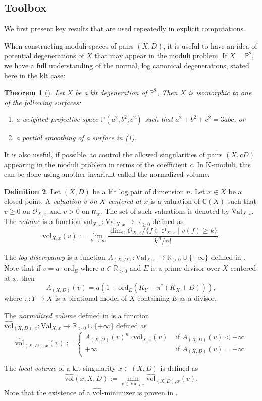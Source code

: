 \documentclass[11pt]{amsart}
\numberwithin{equation}{section}
\newtheorem{theorem}{Theorem}[section]
\theoremstyle{definition}
\newtheorem{defn}[theorem]{Definition}
\newcommand{\bC}{\mathbb{C}}
\newcommand{\bR}{\mathbb{R}}
\newcommand{\bP}{\mathbb{P}}
\newcommand{\cO}{\mathcal{O}}
\newcommand{\hvol}{\widehat{\mathrm{vol}}}
\newcommand{\ord}{\mathrm{ord}}
\newcommand{\Val}{\mathrm{Val}}
\newcommand{\vol}{\mathrm{vol}}
\newcommand{\fm}{\mathfrak{m}}
\begin{document}
\subsection{Toolbox}

We first present key results that are used repeatedly in explicit computations. 

When constructing moduli spaces of pairs $(X,D)$, it is useful to have an idea of potential degenerations of $X$ that may appear in the moduli problem.  If $X = \bP^2$, we have a full understanding of the normal, log canonical degenerations, stated here in the klt case: 

\begin{theorem}[\cite{hp}]\label{t:kltdegens}
    Let $X$ be a klt degeneration of $\bP^2$, Then $X$ is isomorphic to one of the following surfaces: 
        \begin{enumerate}
            \item a weighted projective space $\bP(a^2,b^2,c^2)$ such that $a^2 + b^2 + c^2 = 3abc$, or 
            \item a partial smoothing of a surface in (1). 
        \end{enumerate}
\end{theorem}

It is also useful, if possible, to control the allowed singularities of pairs $(X, cD)$ appearing in the moduli problem in terms of the coefficient $c$. In K-moduli, this can be done using another invariant called the normalized volume. 

\begin{defn}
Let $(X,D)$ be a klt log pair of dimension $n$. Let $x\in X$ be a closed point. A \emph{valuation $v$ on $X$ centered at $x$} is a valuation of $\bC(X)$ such that $v\geq 0$ on $\cO_{X,x}$ and $v>0$ on $\fm_x$. The set of such valuations is denoted by $\Val_{X,x}$.
The \emph{volume} is a function $\vol_{X,x}:\Val_{X,x}\to \bR_{\geq 0}$ defined as 
\[
\vol_{X,x}(v):=\lim_{k\to\infty}\frac{\dim_{\bC}\cO_{X,x}/\{f\in\cO_{X,x}\mid v(f)\geq k\}}{k^n/n!}.
\]

The \emph{log discrepancy}  is a function $A_{(X,D)}:\Val_{X,x}\to \bR_{>0}\cup\{+\infty\}$ defined in \cite{JM}. Note that if $v=a\cdot\ord_E$ where $a\in\bR_{>0}$ and $E$ is a prime divisor over $X$ centered at $x$, then 
\[
A_{(X,D)}(v)=a(1+\ord_E(K_{Y}-\pi^*(K_X+D))),
\]
where $\pi:Y\to X$ is a birational model of $X$ containing $E$ as a divisor.

The \emph{normalized volume} defined in \cite{Li18} is a function $\hvol_{(X,D),x}:\Val_{X,x}\to \bR_{>0}\cup\{+\infty\}$ defined as
\[
\hvol_{(X,D),x}(v):=\begin{cases}
A_{(X,D)}(v)^n\cdot\vol_{X,x}(v) & \textrm{ if } A_{(X,D)}(v)<+\infty\\
+\infty & \textrm{ if }A_{(X,D)}(v)=+\infty
\end{cases}
\]

The \emph{local volume} of a klt singularity $x\in (X,D)$ is defined as 
\[
\hvol(x,X,D):=\min_{v\in\Val_{X,x}}\hvol_{(X,D),x}(v).
\]
Note that the existence of a $\hvol$-minimizer is proven in \cite{Blu18}.
\end{defn}
\end{document}
